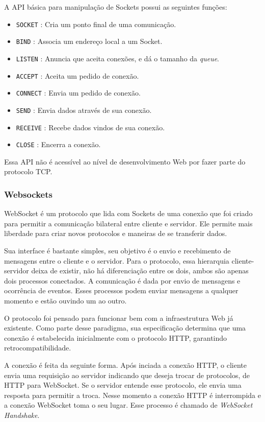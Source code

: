 \documentclass[a4paper,12pt]{article}
\newcommand{\code}[1]{\lstinline[mathescape=true, columns=fixed, basicstyle={\small\ttfamily}]{#1}}
\begin{document}
A API básica para manipulação de Sockets possui as seguintes funções:

\begin{itemize}

    \item \code{SOCKET} : Cria um ponto final de uma comunicação.
    \item \code{BIND} : Associa um endereço local a um Socket.
    \item \code{LISTEN} : Anuncia que aceita conexões, e dá o tamanho da \emph{queue}.
    \item \code{ACCEPT} : Aceita um pedido de conexão.
    \item \code{CONNECT} : Envia um pedido de conexão.
    \item \code{SEND} : Envia dados através de sua conexão.
    \item \code{RECEIVE} : Recebe dados vindos de sua conexão.
    \item \code{CLOSE} : Encerra a conexão.

\end{itemize}

Essa API não é acessível ao nível de desenvolvimento Web por fazer parte do protocolo TCP.


\subsubsection{Websockets}

WebSocket é um protocolo que lida com Sockets de uma conexão que foi criado para permitir a comunicação bilateral entre cliente e servidor. Ele permite mais liberdade para criar novos protocolos e maneiras de se transferir dados.

Sua interface é bastante simples, seu objetivo é o envio e recebimento de mensagens entre o cliente e o servidor. Para o protocolo, essa hierarquia cliente-servidor deixa de existir, não há diferenciação entre os dois, ambos são apenas dois processos conectados. A comunicação é dada por envio de mensagens e ocorrência de eventos. Esses processos podem enviar mensagens a qualquer momento e estão ouvindo um ao outro.

O protocolo foi pensado para funcionar bem com a infraestrutura Web já existente. Como parte desse paradigma, sua especificação determina que uma conexão é estabelecida inicialmente com o protocolo HTTP, garantindo retrocompatibilidade.

A conexão é feita da seguinte forma. Após inciada a conexão HTTP, o cliente envia uma requisição ao servidor indicando que deseja trocar de protocolos, de HTTP para WebSocket. Se o servidor entende esse protocolo, ele envia uma resposta para permitir a troca. Nesse momento a conexão HTTP é interrompida e a conexão WebSocket toma o seu lugar. Esse processo é chamado de \emph{WebSocket Handshake}.
\end{document}
